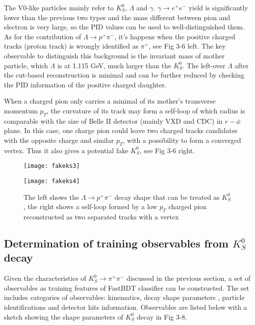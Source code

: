 The V0-like particles mainly refer to $K_S^0$, $\Lambda$ and $\gamma$. $\gamma \to e^+ e^-$ yield is significantly lower than the previous two types and the mass different between pion and electron is very large, so the PID values can be used to well-distinguished them. As for the contribution of $\Lambda \to p^+ \pi^-$, it's happens when the positive charged tracks (proton track) is wrongly identified as $\pi^+$, see Fig 3-6 left. The key observable to distinguish this background is the invariant mass of mother particle, which $\Lambda$ is at 1.115 GeV, much larger than the $K_S^0$. The left-over $\Lambda$ after the cut-based reconstruction is minimal and can be further reduced by checking the PID information of the positive charged daughter. 

When a charged pion only carries a minimal of its mother's transverse momentum $p_T$, the curvature of its track may form a self-loop of which radius is comparable with the size of Belle II detector (mainly VXD and CDC) in $r-\phi$ plane. In this case, one charge pion could leave two charged tracks candidates with the opposite charge and similar $p_T$, with a possibility to form a converged vertex. Thus it also gives a potential fake $K_S^0$, see Fig 3-6 right.

\begin{figure}[htbp]
	\begin{minipage}[t]{0.5\linewidth} %
		\centering 
		\texttt{[image: fakeks3]} 
		\label{fig:side:a} 
	\end{minipage}%
	\begin{minipage}[t]{0.5\linewidth} 
		\centering 
		\texttt{[image: fakeks4]} 
		\label{fig:side:b} 
	\end{minipage}%
	
	\caption{The left shows the $\Lambda \to p^+ \pi^-$ decay shape that can be treated as $K_S^0$, the right shows a self-loop formed by a low $p_T$ charged pion reconstructed as two separated tracks with a vertex}
\end{figure}

\subsection{Determination of training observables from $K_S^0$ decay }
Given the characteristics of  $K_S^0 \to \pi^+ \pi^-$ discussed in the previous section, a set of observables as training features of FastBDT classifier can be constructed. The set includes categories of observables: kinematics, decay shape parameters , particle identifications and detector hits information. Observables are listed below with a sketch showing the shape parameters of $K_S^0$ decay in Fig 3-8. 

